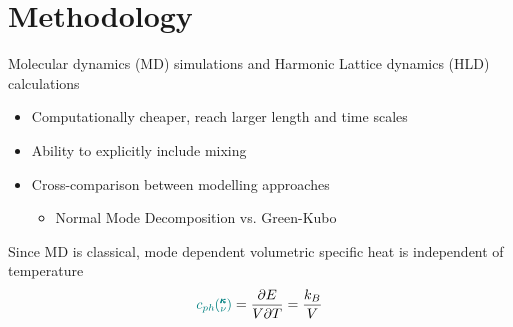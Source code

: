 \documentclass{beamer}
\newcommand{\kv}{\mspace{-4.0mu}\left(\mspace{-8.0mu}
\begin{smallmatrix}&\pmb{\kappa} \\&\nu\end{smallmatrix}
\mspace{-3.0mu}\right)}
\begin{document}
\section{Methodology}
\begin{frame}{Molecular dynamics (MD) simulations and Harmonic Lattice dynamics (HLD) calculations}
\begin{itemize}
\item Computationally cheaper, reach larger length and time scales
\item Ability to explicitly include mixing
\item Cross-comparison between modelling approaches
\begin{itemize}
\item Normal Mode Decomposition vs. Green-Kubo
\end{itemize}
\end{itemize}


Since MD is classical, mode dependent volumetric specific heat is independent of temperature
\begin{equation}\label{EQ:Cph}
\textcolor{teal}{c_{ph}\kv}=\frac{\partial E}{V\partial T}=\frac{k_B}{V}	
\end{equation}
\end{frame}
\end{document}
